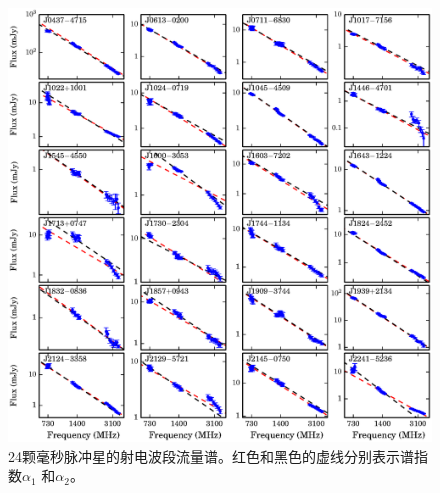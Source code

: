 \begin{figure}
\begin{center}
\includegraphics[width=6 in]{specIndex.ps}
\caption{24颗毫秒脉冲星的射电波段流量谱。红色和黑色的虚线分别表示谱指数$\alpha_1$
和$\alpha_2$。} 
\label{index}
\end{center}
\end{figure}


